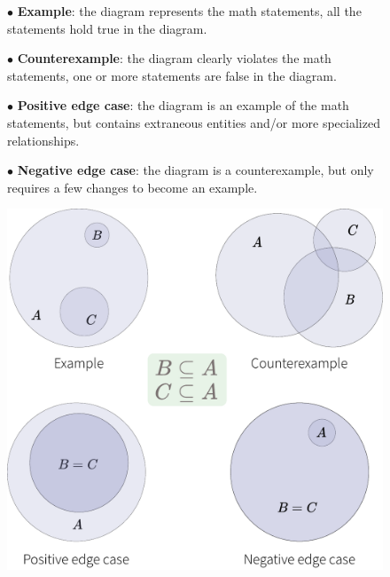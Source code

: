 \vspace{0.5em}
\begin{figure}[h]
\begin{minipage}[b]{0.48\linewidth}
$\bullet$ \textbf{Example}: the diagram represents the math statements, \ie all the statements hold true in the diagram. 
    \vspace{3pt}
    
$\bullet$ \textbf{Counterexample}: the diagram clearly violates the math statements, \ie one or more statements are false in the diagram.
    \vspace{3pt}
    
$\bullet$ \textbf{Positive edge case}: the diagram is an example of the math statements, but contains extraneous entities and/or more specialized relationships. 
    \vspace{3pt}
    
$\bullet$ \textbf{Negative edge case}: the diagram is a counterexample, but only requires a few changes to become an example.
\end{minipage}
\hfill
\begin{minipage}[b]{0.45\linewidth}
    \centering
    \includegraphics[width=\textwidth]{assets/appendix/definitions-examples.pdf}
\end{minipage}
\end{figure}


